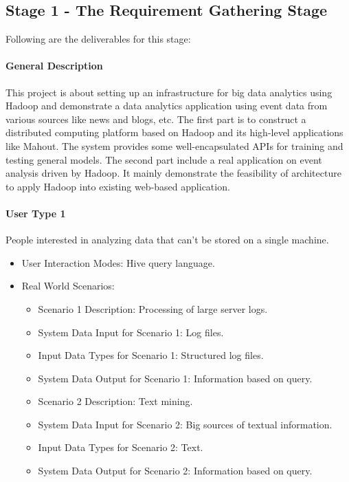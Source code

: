 \subsection{Stage 1 - The Requirement Gathering Stage}
\label{sec:stage1}

Following are the deliverables for this stage:

\paragraph{General Description}
This project is about setting up an infrastructure for big data analytics using
Hadoop and demonstrate a data analytics application using event data from
various sources like news and blogs, etc. The first part is to construct a
distributed computing platform based on Hadoop and its high-level applications
like Mahout. The system provides some well-encapsulated APIs for training and
testing general models. The second part include a real application on event
analysis driven by Hadoop. It mainly demonstrate the feasibility of
architecture to apply Hadoop into existing web-based application.

\paragraph{User Type 1}

People interested in analyzing data that can't be stored on a single machine.

\begin{itemize}
\item User Interaction Modes: Hive query language.
\item Real World Scenarios:
  \begin{itemize}
  \item Scenario 1 Description: Processing of large server logs.
  \item System Data Input for Scenario 1: Log files.
  \item Input Data Types for Scenario 1: Structured log files.
  \item System Data Output for Scenario 1: Information based on query.
  \item Scenario 2 Description: Text mining.
  \item System Data Input for Scenario 2: Big sources of textual information.
  \item Input Data Types for Scenario 2: Text.
  \item System Data Output for Scenario 2: Information based on query.
  \end{itemize}
\end{itemize}

